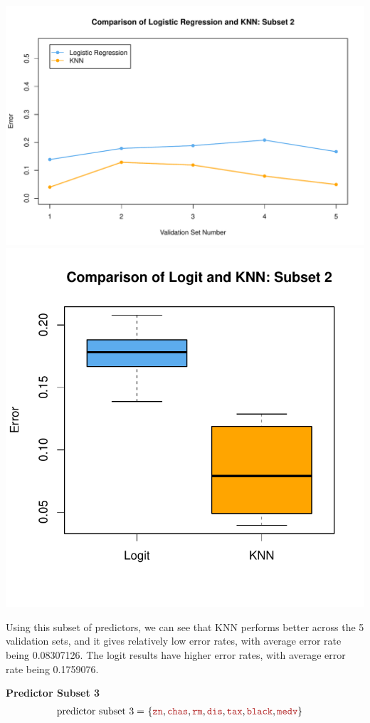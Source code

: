 \documentclass{article}
\begin{document}
\begin{center}
    \includegraphics[width=0.8\linewidth]{Images/Prob5/Prob5-13-Plot-Subset2.pdf}
    \includegraphics[width=0.45\linewidth]{Images/Prob5/Prob5-13-Boxplot-Subset2.pdf}
\end{center}

Using this subset of predictors, we can see that KNN performs better across the 5 validation sets, and it gives relatively low error rates, with average error rate being  0.08307126.
The logit results have higher error rates, with average error rate being 0.1759076.
\bigskip




\noindent\textbf{Predictor Subset 3}
\[
    \begin{aligned}
    \text{predictor subset 3} =&\ 
    \{ 
    \feat{zn}, \feat{chas}, \feat{rm}, \feat{dis},
              \feat{tax}, \feat{black}, \feat{medv}
    \}
    \end{aligned}
\]
\end{document}
